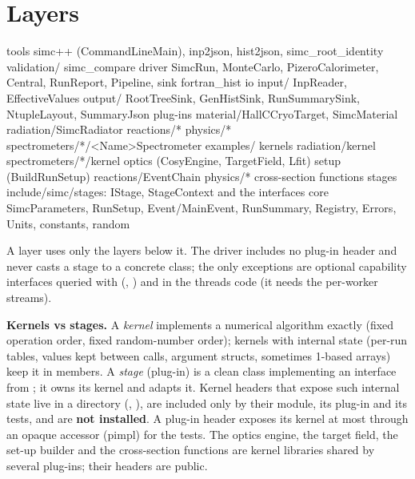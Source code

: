 \section{\texorpdfstring{Layers}{Layers}}\label{developer_manual-03u5farchitecture:31-layers}
\begin{simcplain}[basicstyle=\ttfamily\tiny]
 tools        simc++ (CommandLineMain), inp2json, hist2json, simc_root_identity     validation/ simc_compare
 driver       SimcRun, MonteCarlo, PizeroCalorimeter, Central, RunReport, Pipeline, sink fortran_hist
 io           input/  InpReader, EffectiveValues          output/  RootTreeSink, GenHistSink, RunSummarySink,
                                                                   NtupleLayout, SummaryJson
 plug-ins     material/HallCCryoTarget, SimcMaterial   radiation/SimcRadiator   reactions/*   physics/*
              spectrometers/*/<Name>Spectrometer   examples/
 kernels      radiation/kernel   spectrometers/*/kernel   optics (CosyEngine, TargetField, Lfit)
              setup (BuildRunSetup)   reactions/EventChain   physics/* cross-section functions
 stages       include/simc/stages: IStage, StageContext and the interfaces
 core         SimcParameters, RunSetup, Event/MainEvent, RunSummary, Registry, Errors, Units, constants, random
\end{simcplain}
A layer uses only the layers below it. The driver includes no plug-in header and never casts a stage to a concrete
class; the only exceptions are optional capability interfaces queried with  (,
) and  in the threads code (it needs the per-worker streams).

\textbf{Kernels vs stages.} A \emph{kernel} implements a numerical algorithm exactly (fixed operation order, fixed random-number
order); kernels with internal state (per-run tables, values kept between calls, argument structs, sometimes 1-based
arrays) keep it in members. A \emph{stage} (plug-in) is a clean class implementing an interface from
; it owns its kernel and adapts it. Kernel headers that expose such internal state live in a
 directory (, ), are included only by their module, its plug-in and
its tests, and are \textbf{not installed}. A plug-in header exposes its kernel at most through an opaque  accessor
(pimpl) for the tests. The optics engine, the target field, the set-up builder and the cross-section functions are
kernel libraries shared by several plug-ins; their headers are public.

